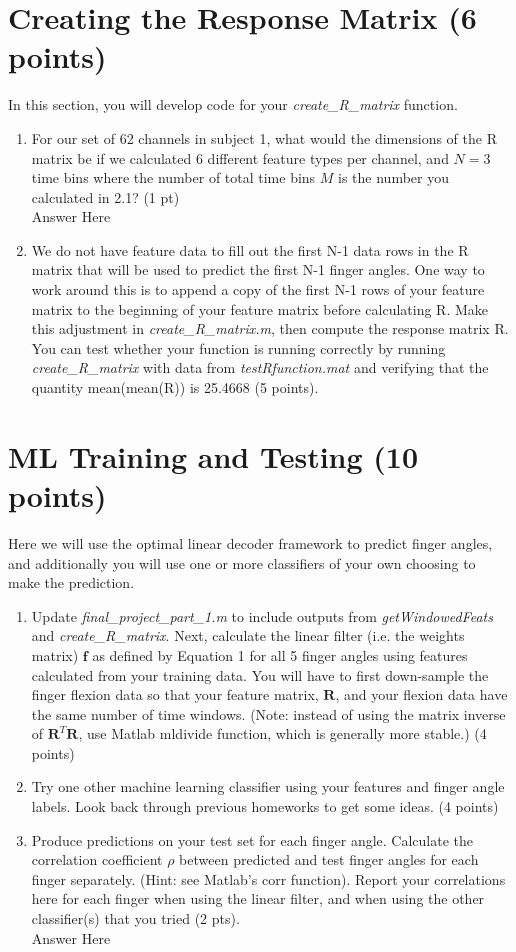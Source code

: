 \documentclass{article}
\begin{document}
\section{Creating the Response Matrix (6 points)}
In this section, you will develop code for your \emph{create\_R\_matrix} function. 
\begin{enumerate}
    \item For our set of 62 channels in subject 1, what would the dimensions of the R matrix be if we calculated 6 different feature types per channel, and $N=3$ time bins where the number of total time bins $M$ is the number you calculated in 2.1? (1 pt)\\
    Answer Here 
    
    \item We do not have feature data to fill out the first N-1 data rows in the R matrix that will be used to predict the first N-1 finger angles. One way to work around this is to append a copy of the first N-1 rows of your feature matrix to the beginning of your feature matrix before calculating R. Make this adjustment in \emph{create\_R\_matrix.m}, then compute the response matrix R. You can test whether your function is running correctly by running \emph{create\_R\_matrix} with data from \emph{testRfunction.mat} and verifying that the quantity mean(mean(R)) is 25.4668 (5 points). 
\end{enumerate}

\section{ML Training and Testing (10 points)}
Here we will use the optimal linear decoder framework to predict finger angles, and additionally you will use one or more classifiers of your own choosing to make the prediction. 
\begin{enumerate}
    \item Update \emph{final\_project\_part\_1.m} to include outputs from \emph{getWindowedFeats} and \emph{create\_R\_matrix}. Next, calculate the linear filter (i.e. the weights matrix) $\mathbf{f}$ as defined by Equation 1 for all 5 finger angles using features calculated from your training data. You will have to first down-sample the finger flexion data so that your feature matrix, $\mathbf{R}$, and your flexion data have the same number of time windows. (Note: instead of using the matrix inverse of $\mathbf{R}^T\mathbf{R}$, use Matlab mldivide function, which is generally more stable.) (4 points)
    
    \item Try one other machine learning classifier using your features and finger angle labels. Look back through previous homeworks to get some ideas. (4 points)
    
    \item Produce predictions on your test set for each finger angle. Calculate the correlation coefficient $\rho$ between predicted and test finger angles for each finger separately. (Hint: see Matlab’s corr function). Report your correlations here for each finger when using the linear filter, and when using the other classifier(s) that you tried (2 pts). \\
    Answer Here
\end{enumerate}
\end{document}

